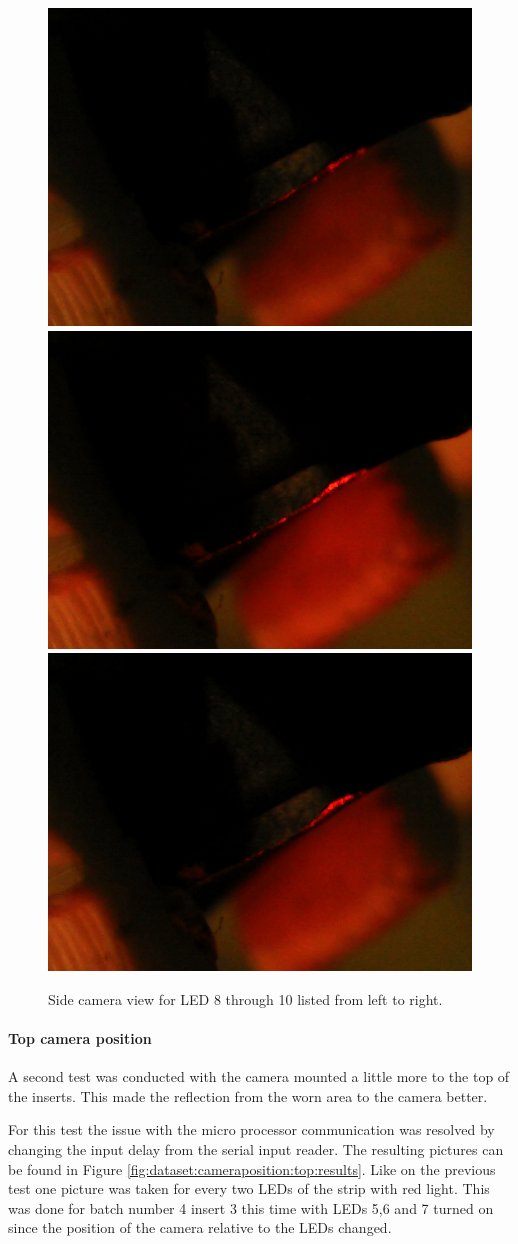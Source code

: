 		\begin{figure}
			\includegraphics[width=.3\textwidth, keepaspectratio=true]{./fig/Vision/Dataset/automated_datasets/1_check_camera_position/1_camera_position_side/p3_l8.png}\hfill
			\includegraphics[width=.3\textwidth, keepaspectratio=true]{./fig/Vision/Dataset/automated_datasets/1_check_camera_position/1_camera_position_side/p3_l9.png}\hfill
			\includegraphics[width=.3\textwidth, keepaspectratio=true]{./fig/Vision/Dataset/automated_datasets/1_check_camera_position/1_camera_position_side/p3_l10.png}
			\caption{Side camera view for LED 8 through 10 listed from left to right.}
			\label{fig:dataset:cameraposition:side:results}
		\end{figure}

		\paragraph{Top camera position}

A second test was conducted with the camera mounted a little more to the top of the inserts. This made the reflection from the worn area to the camera better. 

For this test the issue with the micro processor communication was resolved by changing the input delay from the serial input reader. The resulting pictures can be found in Figure \ref{fig:dataset:cameraposition:top:results}.
Like on the previous test one picture was taken for every two LEDs of the strip with red light. This was done for batch number 4 insert 3 this time with LEDs 5,6 and 7 turned on since the position of the camera relative to the LEDs changed.

